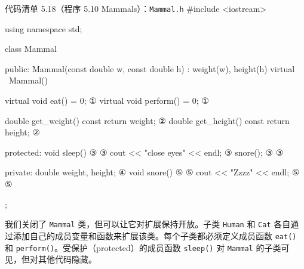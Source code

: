 \begin{codeboxt}{代码清单 5.18（程序 5.10 Mammals）：\texttt{Mammal.h}}
#include <iostream>

using namespace std;

class Mammal
{
public:
    Mammal(const double w, const double h) : weight(w), height(h) {}
    virtual ~Mammal() {}

    virtual void eat() = 0;                          ①
    virtual void perform() = 0;                      ①

    double get_weight() const { return weight; }     ②
    double get_height() const { return height; }     ②

protected:
    void sleep()                                     ③
    {                                                ③
        cout << "close eyes" << endl;                ③
        snore();                                     ③
    }                                                ③

private:
    double weight, height;                           ④
    void snore()                                     ⑤
    {                                                ⑤
        cout << "Zzzz" << endl;                      ⑤
    }                                                ⑤
};
\end{codeboxt}
\par
{}\par
{}\par
{}\par
{}\par

我们关闭了 \texttt{Mammal} 类，但可以让它对扩展保持开放。子类 \texttt{Human} 和 \texttt{Cat} 各自通过添加自己的成员变量和函数来扩展该类。每个子类都必须定义成员函数 \texttt{eat()} 和 \texttt{perform()}。受保护（protected）的成员函数 \texttt{sleep()} 对 \texttt{Mammal} 的子类可见，但对其他代码隐藏。

